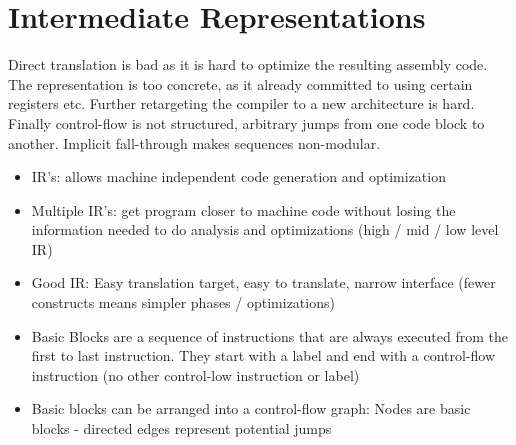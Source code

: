 \section*{Intermediate Representations}

Direct translation is bad as it is hard to optimize the resulting assembly code. The representation is too concrete, as it already committed to using certain registers etc. Further retargeting the compiler to a new architecture is hard. Finally control-flow is not structured, arbitrary jumps from one code block to another. Implicit fall-through makes sequences non-modular.

\begin{itemize}
	\item IR's: allows machine independent code generation and optimization
	
	\item Multiple IR's: get program closer to machine code without losing the information needed to do analysis and optimizations (high / mid / low level IR)
		
	\item Good IR: Easy translation target, easy to translate, narrow interface (fewer constructs means simpler phases / optimizations)
	
	\item Basic Blocks are a sequence of instructions that are always executed from the first to last instruction. They start with a label and end with a control-flow instruction (no other control-low instruction or label)
	
	\item Basic blocks can be arranged into a control-flow graph: Nodes are basic blocks - directed edges represent potential jumps
\end{itemize}
